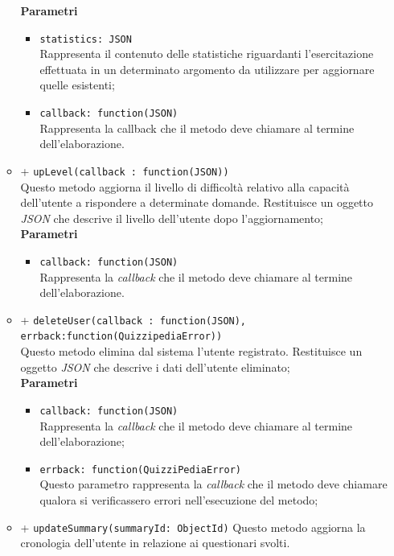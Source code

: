\begin{itemize}
\begin{itemize}
		\textbf{Parametri} 
			\begin{itemize}
			\item
				\texttt{statistics: JSON} \\
				Rappresenta il contenuto delle statistiche riguardanti l'esercitazione effettuata in un determinato argomento da utilizzare per aggiornare quelle esistenti;
			\item	
				\texttt{callback: function(JSON)} \\
				Rappresenta la callback che il metodo deve chiamare al termine dell'elaborazione.
			\end{itemize}
		\item		
		+ \texttt{upLevel(callback : function(JSON))} \\
		Questo metodo aggiorna il livello di difficoltà relativo alla capacità dell'utente a rispondere a determinate domande. Restituisce un oggetto \textit{JSON} che descrive il livello dell'utente dopo l'aggiornamento;	\\	
		\textbf{Parametri} 
			\begin{itemize}
			\item	
				\texttt{callback: function(JSON)} \\
				Rappresenta la \textit{callback} che il metodo deve chiamare al termine dell'elaborazione.		
			\end{itemize}
		\item		
		+ \texttt{deleteUser(callback : function(JSON), errback:function(QuizzipediaError))} \\	
		Questo metodo elimina dal sistema l'utente registrato. Restituisce un oggetto \textit{JSON} che descrive i dati dell'utente eliminato;	\\	
		\textbf{Parametri} 
			\begin{itemize}
			\item	
				\texttt{callback: function(JSON)} \\
				Rappresenta la \textit{callback} che il metodo deve chiamare al termine dell'elaborazione;	
			\item	
				\texttt{errback: function(QuizziPediaError)} \\
				Questo parametro rappresenta la \textit{callback} che il metodo deve chiamare qualora si verificassero errori nell'esecuzione del metodo;		
			\end{itemize}
		\item	
		+ \texttt{updateSummary(summaryId: ObjectId)}	
		Questo metodo aggiorna la cronologia dell'utente in relazione ai questionari svolti.\\	

\end{itemize}
\end{itemize}
